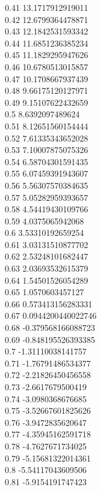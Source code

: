 {0.41	13.1717912919011\\
0.42	12.6799364478871\\
0.43	12.1842531593342\\
0.44	11.6851236385234\\
0.45	11.1829295947626\\
0.46	10.6780513015857\\
0.47	10.1708667937439\\
0.48	9.66175120127971\\
0.49	9.15107622432659\\
0.5	8.6392097489624\\
0.51	8.12651560154444\\
0.52	7.61335343652028\\
0.53	7.10007875075326\\
0.54	6.58704301591435\\
0.55	6.07459391943607\\
0.56	5.56307570384635\\
0.57	5.05282959393657\\
0.58	4.54419430109766\\
0.59	4.0375065942068\\
0.6	3.53310192659254\\
0.61	3.03131510877702\\
0.62	2.53248101682447\\
0.63	2.03693532615379\\
0.64	1.54501526054289\\
0.65	1.0570603457127\\
0.66	0.573413156283331\\
0.67	0.0944200440022746\\
0.68	-0.379568166088723\\
0.69	-0.848195526393385\\
0.7	-1.31110038141757\\
0.71	-1.76791486534377\\
0.72	-2.21826450456558\\
0.73	-2.6617679500419\\
0.74	-3.0980368676685\\
0.75	-3.52667601825626\\
0.76	-3.9472835620647\\
0.77	-4.35945162591718\\
0.78	-4.7627671734025\\
0.79	-5.15681322014361\\
0.8	-5.54117043609506\\
0.81	-5.9154191747423\\
}
